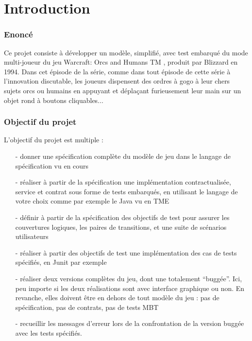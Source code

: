 \part{Introduction}

\section{Enoncé}
	Ce projet consiste à développer un modèle, simplifié, avec
test embarqué du mode multi-joueur du jeu Warcraft:
Orcs and Humans TM , produit par Blizzard en 1994.
Dans cet épisode de la série, comme dans tout épisode de
cette série à l’innovation discutable, les joueurs dispensent
des ordres à gogo à leur chers sujets \− orcs ou humains \−
en appuyant et déplaçant furieusement leur main sur un
objet rond à boutons cliquables...

\section{Objectif du projet}
L’objectif du projet est multiple :
	\begin{itemize}
		\item[-] donner une spécification complète du modèle de jeu dans le langage de spécification vu en cours
		\item[-] réaliser à partir de la spécification une implémentation contractualisée, service et contrat sous
forme de tests embarqués, en utilisant le langage de votre choix comme par exemple le Java vu en
TME
		\item[-] définir à partir de la spécification des objectifs de test pour assurer les couvertures logiques, les paires de transitions, et une suite de scénarios utilisateurs
		\item[-]	réaliser à partir des objectifs de test une implémentation des cas de tests spécifiés, en Junit par
exemple
		\item[-] réaliser deux versions complètes du jeu, dont une totalement “buggée”. Ici, peu importe si les deux
réalisations sont avec interface graphique ou non. En revanche, elles doivent être en dehors de tout
modèle du jeu : pas de spécification, pas de contrats, pas de tests MBT
		 \item[-] recueillir les messages d’erreur lors de la confrontation de la version buggée avec les tests spécifiés.
	\end{itemize}

